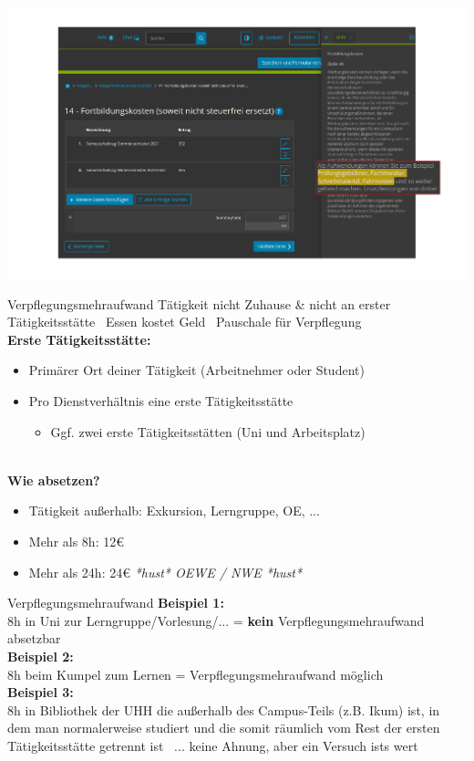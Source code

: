 \documentclass{beamer}
\newcommand{\n}{\hfill\\\vspace{0.25cm}}
\begin{document}
			\begin{frame}
				\begin{center}
					\vspace{-0.6cm}
					\hspace*{-0.91cm}
					\includegraphics[scale=0.24]{images/elster-fortbildungskosten-3}
				\end{center}
			\end{frame}
		
			\begin{frame}{Verpflegungsmehraufwand}
				Tätigkeit nicht Zuhause \& nicht an erster Tätigkeitsstätte \textrightarrow\ Essen kostet Geld \textrightarrow\ Pauschale für Verpflegung\n
				\textbf{Erste Tätigkeitsstätte:}
				\begin{itemize}
					\item Primärer Ort deiner Tätigkeit (Arbeitnehmer oder Student)
					\item Pro Dienstverhältnis eine erste Tätigkeitsstätte
					\begin{itemize}
						\item Ggf. zwei erste Tätigkeitsstätten (Uni und Arbeitsplatz)
					\end{itemize}
				\end{itemize}\n
				\textbf{Wie absetzen?}
				\begin{itemize}
					\item Tätigkeit außerhalb: Exkursion, Lerngruppe, OE, ...
					\item Mehr als 8h: 12€
					\item Mehr als 24h: 24€ {\tiny \textit{*hust* OEWE / NWE *hust*}}
				\end{itemize}
			\end{frame}
		
			\begin{frame}{Verpflegungsmehraufwand}
				\textbf{Beispiel 1:}\\
				8h in Uni zur Lerngruppe/Vorlesung/... = \textbf{kein} Verpflegungsmehraufwand absetzbar\n
				\textbf{Beispiel 2:}\\
				8h beim Kumpel zum Lernen = Verpflegungsmehraufwand möglich\n
				\textbf{Beispiel 3:}\\
				8h in Bibliothek der UHH die außerhalb des Campus-Teils (z.B. Ikum) ist, in dem man normalerweise studiert und die somit räumlich vom Rest der ersten Tätigkeitsstätte getrennt ist \textrightarrow\ ... keine Ahnung, aber ein Versuch ists wert
			\end{frame}
		
\end{document}
